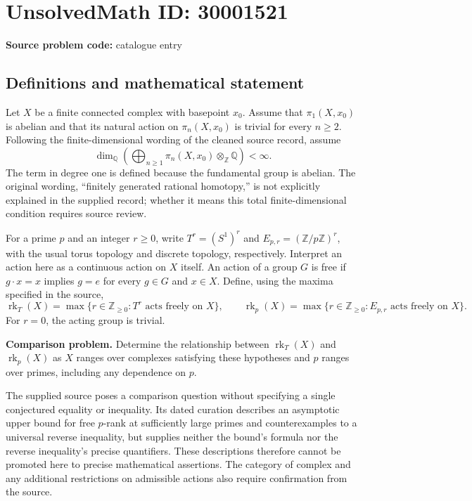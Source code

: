 \documentclass[11pt]{article}
\newcommand{\Z}{\mathbb{Z}}
\newcommand{\Q}{\mathbb{Q}}
\begin{document}
\section*{UnsolvedMath ID: 30001521}
\textbf{Source problem code:} catalogue entry
\subsection{Definitions and mathematical statement}
Let \(X\) be a finite connected complex with basepoint \(x_0\). Assume that \(\pi_1(X,x_0)\) is abelian and that its natural action on \(\pi_n(X,x_0)\) is trivial for every \(n\geq 2\). Following the finite-dimensional wording of the cleaned source record, assume
\[
\dim_{\Q}\left(\bigoplus_{n\geq 1}\pi_n(X,x_0)\otimes_{\Z}\Q\right)<\infty.
\]
The term in degree one is defined because the fundamental group is abelian. The original wording, ``finitely generated rational homotopy,'' is not explicitly explained in the supplied record; whether it means this total finite-dimensional condition requires source review.

For a prime \(p\) and an integer \(r\geq 0\), write \(T^r=(S^1)^r\) and \(E_{p,r}=(\Z/p\Z)^r\), with the usual torus topology and discrete topology, respectively. Interpret an action here as a continuous action on \(X\) itself. An action of a group \(G\) is free if \(g\cdot x=x\) implies \(g=e\) for every \(g\in G\) and \(x\in X\). Define, using the maxima specified in the source,
\[
\operatorname{rk}_T(X)=\max\{r\in\Z_{\geq 0}:T^r\text{ acts freely on }X\},
\qquad
\operatorname{rk}_p(X)=\max\{r\in\Z_{\geq 0}:E_{p,r}\text{ acts freely on }X\}.
\]
For \(r=0\), the acting group is trivial.

\textbf{Comparison problem.} Determine the relationship between \(\operatorname{rk}_T(X)\) and \(\operatorname{rk}_p(X)\) as \(X\) ranges over complexes satisfying these hypotheses and \(p\) ranges over primes, including any dependence on \(p\).

The supplied source poses a comparison question without specifying a single conjectured equality or inequality. Its dated curation describes an asymptotic upper bound for free \(p\)-rank at sufficiently large primes and counterexamples to a universal reverse inequality, but supplies neither the bound's formula nor the reverse inequality's precise quantifiers. These descriptions therefore cannot be promoted here to precise mathematical assertions. The category of complex and any additional restrictions on admissible actions also require confirmation from the source.
\end{document}
